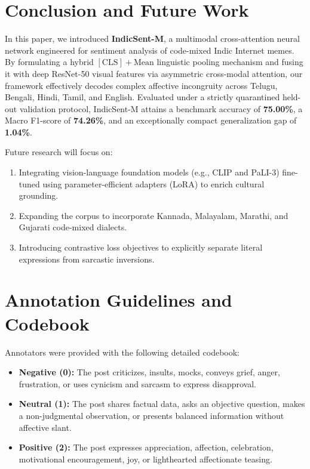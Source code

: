 \documentclass[10pt,journal,compsoc]{IEEEtran}
\begin{document}
\section{Conclusion and Future Work}
\label{sec:conclusion}

In this paper, we introduced \textbf{IndicSent-M}, a multimodal cross-attention neural network engineered for sentiment analysis of code-mixed Indic Internet memes. By formulating a hybrid $[\text{CLS}] + \text{Mean}$ linguistic pooling mechanism and fusing it with deep ResNet-50 visual features via asymmetric cross-modal attention, our framework effectively decodes complex affective incongruity across Telugu, Bengali, Hindi, Tamil, and English. Evaluated under a strictly quarantined held-out validation protocol, IndicSent-M attains a benchmark accuracy of \textbf{75.00\%}, a Macro F1-score of \textbf{74.26\%}, and an exceptionally compact generalization gap of \textbf{1.04\%}.

Future research will focus on:
\begin{enumerate}
    \item Integrating vision-language foundation models (e.g., CLIP and PaLI-3) fine-tuned using parameter-efficient adapters (LoRA) to enrich cultural grounding.
    \item Expanding the corpus to incorporate Kannada, Malayalam, Marathi, and Gujarati code-mixed dialects.
    \item Introducing contrastive loss objectives to explicitly separate literal expressions from sarcastic inversions.
\end{enumerate}




\appendices
\section{Annotation Guidelines and Codebook}
Annotators were provided with the following detailed codebook:
\begin{itemize}
    \item \textbf{Negative (0):} The post criticizes, insults, mocks, conveys grief, anger, frustration, or uses cynicism and sarcasm to express disapproval.
    \item \textbf{Neutral (1):} The post shares factual data, asks an objective question, makes a non-judgmental observation, or presents balanced information without affective slant.
    \item \textbf{Positive (2):} The post expresses appreciation, affection, celebration, motivational encouragement, joy, or lighthearted affectionate teasing.
\end{itemize}
\end{document}
